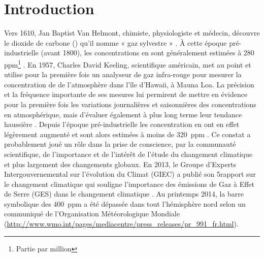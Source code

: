 
\chapter*{Introduction}
\newpage



Vers 1610, Jan Baptist Van Helmont, chimiste, physiologiste et médecin, découvre le dioxide de carbone (\coo) qu'il nomme « gaz sylvestre » \citep{philippedesouabe-zyriane1988}.
À cette époque pré-industrielle (avant 1800), les concentrations en \coo sont généralement estimées à 280 ppm\footnote{Partie par million} \citep{Siegenthaler1987}.
En 1957, Charles David Keeling, scientifique américain, met au point et utilise pour la première fois un analyseur de gaz infra-rouge pour mesurer la concentration de \coo de l'atmosphère dans l'île d'Hawaii, à Mauna Loa.
La précision et la fréquence importante de ses mesures lui permirent de mettre en évidence pour la première fois les variations journalières et saisonnières des concentrations en \coo atmosphérique, mais d'évaluer également à plus long terme leur tendance haussière \citep{harris2010}.
Depuis l'époque pré-industrielle les concentration en \coo ont en effet légèrement augmenté et sont alors estimées à moins de \SI{320}{ppm} \citep{pales1965}.
Ce constat a probablement joué un rôle dans la prise de conscience, par la communauté scientifique, de l'importance et de l'intérêt de l'étude du changement climatique et plus largement des changements globaux.
En 2013, le Groupe d'Experts Intergouvernemental sur l'évolution du Climat (GIEC) a publié son 5\ieme rapport sur le changement climatique qui souligne l'importance des émissions de Gaz à Effet de Serre (GES) dans le changement climatique \citep{stocker2013}.
Au printemps 2014, la barre symbolique des \SI{400}{ppm} a été dépassée dans tout l'hémisphère nord selon un communiqué de l'Organisation Météorologique Mondiale (\url{http://www.wmo.int/pages/mediacentre/press_releases/pr_991_fr.html}).


